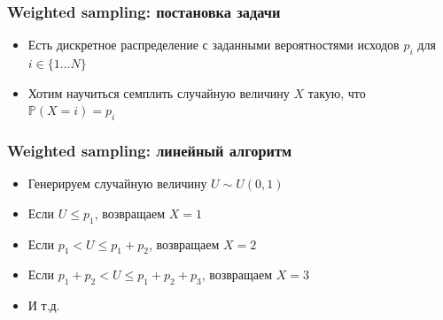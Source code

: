 \documentclass[10pt]{beamer}
\begin{document}
\begin{frame}
\frametitle{Weighted sampling: постановка задачи}
\begin{itemize}
\item Есть дискретное распределение с заданными вероятностями исходов \begin{math}p_i\end{math} для \begin{math}i \in \{1\dots N\}\end{math}
\pause
\item Хотим научиться семплить случайную величину \begin{math}X\end{math} такую, что \begin{math}\mathbb{P}(X = i) = p_i\end{math}
\end{itemize}
\end{frame}

\begin{frame}
\frametitle{Weighted sampling: линейный алгоритм}
\begin{itemize}
\item Генерируем случайную величину \begin{math}U \sim U(0, 1)\end{math}
\pause
\item Если \begin{math}U \leq p_1\end{math}, возвращаем \begin{math}X = 1\end{math}
\pause
\item Если \begin{math}p_1 < U \leq p_1 + p_2\end{math}, возвращаем \begin{math}X = 2\end{math}
\pause
\item Если \begin{math}p_1 + p_2 < U \leq p_1 + p_2 + p_3\end{math}, возвращаем \begin{math}X = 3\end{math}
\pause
\item И т.д.
\end{itemize}
\end{frame}
\end{document}
